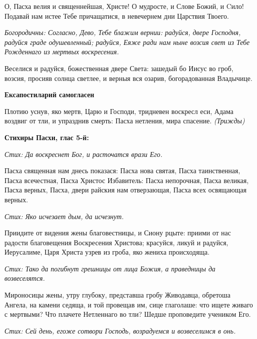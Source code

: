О, Пасха велия и священнейшая, Христе! О мудросте, и Слове Божий, и Cило! Подавай нам истее Тебе причащатися, в невечернем дни Царствия Твоего. 

\itshape Богородичны\normalfont{}: Согласно, Дево, Тебе блажим вернии: радуйся, двере Господня, радуйся граде одушевленный; радуйся, Еяже ради нам ныне возсия свет из Тебе Рожденнаго из мертвых воскресения. 





Веселися и радуйся, божественная двере Света: зашедый бо Иисус во гроб, возсия, просияв солнца светлее, и верныя вся озарив, богорадованная Владычице. 

\medskip\bfseries Ексапостиларий самогласен

\normalfont{}Плотию уснув, яко мертв, Царю и Господи, тридневен воскресл еси, Адама воздвиг от тли, и упразднив смерть: Пасха нетления, мира спасение. \itshape (Трижд\normalfont{}ы) 

\medskip\bfseries Стихиры Пасхи, глас 5-й:

\normalfont{}\itshape Стих\normalfont{}: Да воскреснет Бог, и расточатся врази Его. 





Пасха священная нам днесь показася: Пасха нова святая, Пасха таинственная, Пасха всечестная, Пасха Христос Избавитель: Пасха непорочная, Пасха великая, Пасха верных, Пасха, двери райския нам отверзающая, Пасха всех освящающая верных. 

\itshape Стих\normalfont{}: Яко исчезает дым, да исчезнут. 





Приидите от видения жены благовестницы, и Сиону рцыте: приими от нас радости благовещения Воскресения Христова; красуйся, ликуй и радуйся, Иерусалиме, Царя Христа узрев из гроба, яко жениха происходяща. 

\itshape Стих\normalfont{}: Тако да погибнут грешницы от лица Божия, а праведницы да возвеселятся. 





Мироносицы жены, утру глубоку, представша гробу Живодавца, обретоша Ангела, на камени седяща, и той провещав им, сице глаголаше: что ищете живаго с мертвыми? Что плачете Нетленнаго во тли? Шедше проповедите учеником Его. 

\itshape Стих\normalfont{}: Сей день, егоже сотвори Господь, возрадуемся и возвеселимся в онь. 





